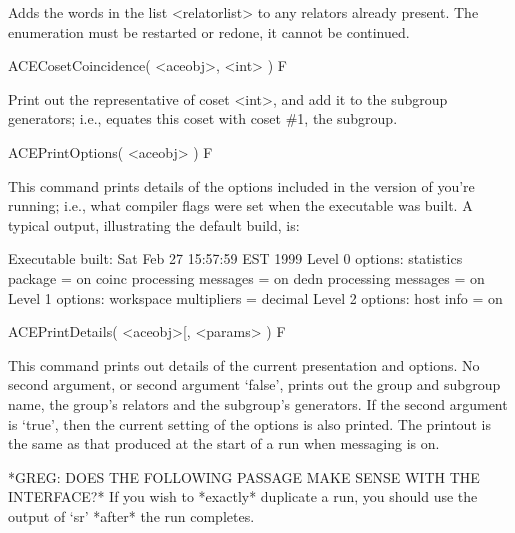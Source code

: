 Adds the words in the list <relatorlist> to any relators already present.
The enumeration must be restarted or redone, it cannot be continued.

\>ACECosetCoincidence( <aceobj>, <int> ) F

Print out the representative of coset <int>, and add it to the
subgroup generators; i.e., equates this coset with coset \#1, the
subgroup.



% 

\>ACEPrintOptions( <aceobj> ) F

This command prints details of the options included  in the version of
{\ACE} you're  running; i.e.,  what compiler flags  were set  when the
executable  was built.   A  typical output,  illustrating the  default
build, is:

\begintt
Executable built:
  Sat Feb 27 15:57:59 EST 1999
Level 0 options:
  statistics package = on
  coinc processing messages = on
  dedn processing messages = on
Level 1 options:
  workspace multipliers = decimal
Level 2 options:
  host info = on
\endtt


\>ACEPrintDetails( <aceobj>[, <params> ) F

This  command  prints out  details  of  the  current presentation  and
options.  No second argument, or second argument `false', prints out
the group
and subgroup name, the group's relators and the subgroup's generators.
If the second argument is `true', then  the current setting of the
options is
also printed.  The printout is the  same as that produced at the start
of a run when messaging is on.


*GREG: DOES THE FOLLOWING PASSAGE MAKE SENSE WITH THE INTERFACE?*
If you wish to *exactly* duplicate a run, you should use the output
of `sr' *after* the run completes.


